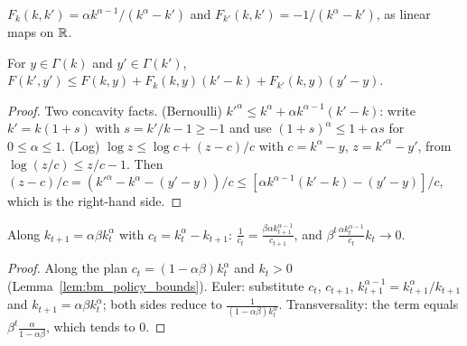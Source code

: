 \begin{definition}
\label{def:bm_marginal}
\leanok
{}
$F_k(k, k') = \alpha k^{\alpha-1}/(k^\alpha - k')$ and $F_{k'}(k, k') = -1/(k^\alpha - k')$, as linear maps on $\mathbb{R}$.
\end{definition}

\begin{lemma}
\label{lem:bm_supergradient}
\leanok
{}
For $y \in \Gamma(k)$ and $y' \in \Gamma(k')$,
$F(k', y') \le F(k, y) + F_k(k, y)(k' - k) + F_{k'}(k, y)(y' - y)$.
\end{lemma}
\begin{proof}
\leanok
Two concavity facts. (Bernoulli) $k'^\alpha \le k^\alpha + \alpha k^{\alpha - 1}(k' - k)$: write
$k' = k(1 + s)$ with $s = k'/k - 1 \ge -1$ and use $(1 + s)^\alpha \le 1 + \alpha s$ for $0 \le \alpha \le 1$.
(Log) $\log z \le \log c + (z - c)/c$ with $c = k^\alpha - y$, $z = k'^\alpha - y'$, from
$\log(z/c) \le z/c - 1$. Then $(z - c)/c = (k'^\alpha - k^\alpha - (y' - y))/c \le
[\alpha k^{\alpha-1}(k' - k) - (y' - y)]/c$, which is the right-hand side.
\end{proof}

\begin{theorem}
\label{thm:bm_euler_tvc}
\leanok
{}
Along $k_{t+1} = \alpha\beta k_t^\alpha$ with $c_t = k_t^\alpha - k_{t+1}$:
$\frac{1}{c_t} = \frac{\beta \alpha k_{t+1}^{\alpha - 1}}{c_{t+1}}$, and
$\beta^t \frac{\alpha k_t^{\alpha-1}}{c_t} k_t \to 0$.
\end{theorem}
\begin{proof}
\leanok
Along the plan $c_t = (1 - \alpha\beta) k_t^\alpha$ and $k_t > 0$ (Lemma~\ref{lem:bm_policy_bounds}).
Euler: substitute $c_t$, $c_{t+1}$, $k_{t+1}^{\alpha-1} = k_{t+1}^\alpha / k_{t+1}$ and
$k_{t+1} = \alpha\beta k_t^\alpha$; both sides reduce to $\frac{1}{(1-\alpha\beta)k_t^\alpha}$.
Transversality: the term equals $\beta^t \frac{\alpha}{1-\alpha\beta}$, which tends to $0$.
\end{proof}

